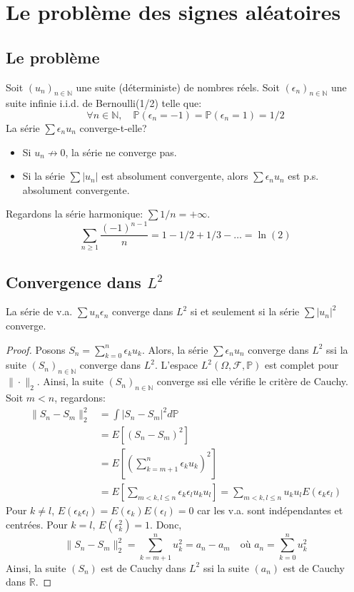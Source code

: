 \chapter{Le problème des signes aléatoires}
\sloppy


\section{Le problème}
Soit $(u_n)_{n \in \mathbb{N}}$ une suite (déterministe) de nombres réels.
Soit $(\epsilon_n)_{n \in \mathbb{N}}$ une suite infinie i.i.d. de Bernoulli(1/2) telle que:
\[ \forall n \in \mathbb{N}, \quad \mathbb{P}(\epsilon_n = -1) = \mathbb{P}(\epsilon_n = 1) = 1/2 \]
La série $\sum \epsilon_n u_n$ converge-t-elle?
\begin{itemize}
    \item Si $u_n \not\to 0$, la série ne converge pas.
    \item Si la série $\sum |u_n|$ est absolument convergente, alors $\sum \epsilon_n u_n$ est p.s. absolument convergente.
\end{itemize}
Regardons la série harmonique: $\sum 1/n = +\infty$.
\[ \sum_{n \ge 1} \frac{(-1)^{n-1}}{n} = 1 - 1/2 + 1/3 - \dots = \ln(2) \]
\section{Convergence dans $L^2$}
\begin{proposition}
La série de v.a. $\sum u_n \epsilon_n$ converge dans $L^2$ si et seulement si la série $\sum |u_n|^2$ converge.
\end{proposition}
\begin{proof}
Posons $S_n = \sum_{k=0}^n \epsilon_k u_k$.
Alors, la série $\sum \epsilon_n u_n$ converge dans $L^2$ ssi la suite $(S_n)_{n \in \mathbb{N}}$ converge dans $L^2$.
L'espace $L^2(\Omega, \mathcal{F}, \mathbb{P})$ est complet pour $\| \cdot \|_2$.
Ainsi, la suite $(S_n)_{n \in \mathbb{N}}$ converge ssi elle vérifie le critère de Cauchy.
Soit $m<n$, regardons:
\begin{align*}
    \|S_n - S_m\|_2^2 &= \int |S_n - S_m|^2 d\mathbb{P} \\
    &= E[(S_n-S_m)^2] \\
    &= E\left[\left(\sum_{k=m+1}^n \epsilon_k u_k\right)^2\right] \\
    &= E\left[\sum_{m<k,l \le n} \epsilon_k \epsilon_l u_k u_l\right] = \sum_{m<k,l \le n} u_k u_l E(\epsilon_k \epsilon_l)
\end{align*}
Pour $k \neq l$, $E(\epsilon_k \epsilon_l) = E(\epsilon_k)E(\epsilon_l) = 0$ car les v.a. sont indépendantes et centrées. Pour $k=l$, $E(\epsilon_k^2)=1$.
Donc,
\[ \|S_n - S_m\|_2^2 = \sum_{k=m+1}^n u_k^2 = a_n - a_m \quad \text{où } a_n = \sum_{k=0}^n u_k^2 \]
Ainsi, la suite $(S_n)$ est de Cauchy dans $L^2$ ssi la suite $(a_n)$ est de Cauchy dans $\mathbb{R}$.
\end{proof}
